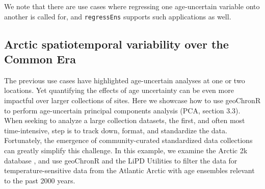 \documentclass[gchron, manuscript]{copernicus}
\begin{document}
We note that there are use cases where regressing one age-uncertain variable onto another is called for, and \texttt{regressEns} supports such applications as well.

\hypertarget{sec:pca}{%
\subsection{Arctic spatiotemporal variability over the Common Era}\label{sec:pca}}

The previous use cases have highlighted age-uncertain analyses at one or two locations. Yet quantifying the effects of age uncertainty can be even more impactful over larger collections of sites. Here we showcase how to use geoChronR to perform age-uncertain principal components analysis (PCA, section 3.3). When seeking to analyze a large collection datasets, the first, and often most time-intensive, step is to track down, format, and standardize the data.
Fortunately, the emergence of community-curated standardized data collections \citep[e.g.][]{PAGES2K_ngeo2013_short, pages2k2017, kaufman2020temp12k, konecky2020iso2k} can greatly simplify this challenge.
In this example, we examine the Arctic 2k database \citep{McKayKaufman2014}, and use geoChronR and the LiPD Utilities to filter the data for temperature-sensitive data from the Atlantic Arctic with age ensembles relevant to the past 2000 years.
\end{document}
